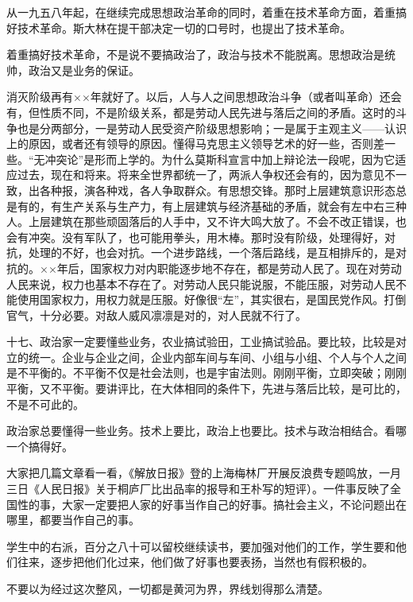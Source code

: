从一九五八年起，在继续完成思想政治革命的同时，着重在技术革命方面，着重搞好技术革命。斯大林在提干部决定一切的口号时，也提出了技术革命。

着重搞好技术革命，不是说不要搞政治了，政治与技术不能脱离。思想政治是统帅，政治又是业务的保证。

消灭阶级再有××年就好了。以后，人与人之间思想政治斗争（或者叫革命）还会有，但性质不同，不是阶级关系，都是劳动人民先进与落后之间的矛盾。这时的斗争也是分两部分，一是劳动人民受资产阶级思想影响；一是属于主观主义——认识上的原因，或者还有领导的原因。懂得马克思主义领导艺术的好一些，否则差一些。“无冲突论”是形而上学的。为什么莫斯科宣言中加上辩论法一段呢，因为它适应过去，现在和将来。将来全世界都统一了，两派人争权还会有的，因为意见不一致，出各种报，演各种戏，各人争取群众。有思想交锋。那时上层建筑意识形态总是有的，有生产关系与生产力，有上层建筑与经济基础的矛盾，就会有左中右三种人。上层建筑在那些顽固落后的人手中，又不许大鸣大放了。不会不改正错误，也会有冲突。没有军队了，也可能用拳头，用木棒。那时没有阶级，处理得好，对抗，处理的不好，也会对抗。一个进步路线，一个落后路线，是互相排斥的，是对抗的。××年后，国家权力对内职能逐步地不存在，都是劳动人民了。现在对劳动人民来说，权力也基本不存在了。对劳动人民只能说服，不能压服，对劳动人民不能使用国家权力，用权力就是压服。好像很“左”，其实很右，是国民党作风。打倒官气，十分必要。对敌人威风凛凛是对的，对人民就不行了。

十七、政治家一定要懂些业务，农业搞试验田，工业搞试验品。要比较，比较是对立的统一。企业与企业之间，企业内部车间与车间、小组与小组、个人与个人之间是不平衡的。不平衡不仅是社会法则，也是宇宙法则。刚刚平衡，立即突破；刚刚平衡，又不平衡。要讲评比，在大体相同的条件下，先进与落后比较，是可比的，不是不可此的。

政治家总要懂得一些业务。技术上要比，政治上也要比。技术与政治相结合。看哪一个搞得好。

大家把几篇文章看一看，《解放日报》登的上海梅林厂开展反浪费专题鸣放，一月三日《人民日报》关于桐庐厂比出品率的报导和王朴写的短评）。一件事反映了全国性的事，大家一定要把人家的好事当作自己的好事。搞社会主义，不论问题出在哪里，都要当作自己的事。

学生中的右派，百分之八十可以留校继续读书，要加强对他们的工作，学生要和他们往来，逐步把他们化过来，他们做了好事也要表扬，当然也有假积极的。

不要以为经过这次整风，一切都是黄河为界，界线划得那么清楚。


